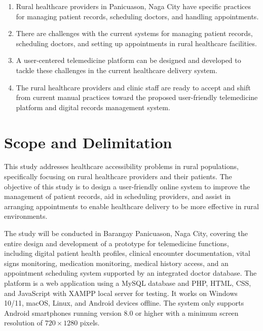 \documentclass[12pt]{report}
\begin{document}
\begin{enumerate}[label=\arabic*., leftmargin=0.75in, itemsep=4pt, parsep=0pt]
  \item Rural healthcare providers in Panicuason, Naga City have specific
        practices for managing patient records, scheduling doctors, and handling
        appointments.
  \item There are challenges with the current systems for managing patient
        records, scheduling doctors, and setting up appointments in rural
        healthcare facilities.
  \item A user-centered telemedicine platform can be designed and developed to
        tackle these challenges in the current healthcare delivery system.
  \item The rural healthcare providers and clinic staff are ready to accept and
        shift from current manual practices toward the proposed user-friendly
        telemedicine platform and digital records management system.
\end{enumerate}

\section*{Scope and Delimitation}

This study addresses healthcare accessibility problems in rural populations,
specifically focusing on rural healthcare providers and their patients. The
objective of this study is to design a user-friendly online system to improve
the management of patient records, aid in scheduling providers, and assist in
arranging appointments to enable healthcare delivery to be more effective in
rural environments.

The study will be conducted in Barangay Panicuason, Naga City, covering the
entire design and development of a prototype for telemedicine functions,
including digital patient health profiles, clinical encounter documentation,
vital signs monitoring, medication monitoring, medical history access, and an
appointment scheduling system supported by an integrated doctor database. The
platform is a web application using a MySQL database and PHP, HTML, CSS, and
JavaScript with XAMPP local server for testing. It works on Windows 10/11,
macOS, Linux, and Android devices offline. The system only supports Android
smartphones running version 8.0 or higher with a minimum screen resolution of
$720 \times 1280$ pixels.
\end{document}
